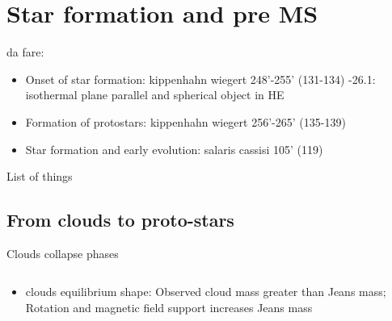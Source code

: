 \section{Star formation and pre MS}

\begin{wordonframe}{da fare: }
\begin{itemize}
\item Onset of star formation: kippenhahn wiegert 248'-255' (131-134) -26.1: isothermal plane parallel and spherical object in HE
\item Formation of protostars: kippenhahn wiegert 256'-265' (135-139)
\item Star formation and early evolution: salaris cassisi 105' (119)
\end{itemize}
\end{wordonframe}


\begin{frame}[allowframebreaks]{List of things}
\listofkeywords
\listoftodos
\end{frame}

\subsection{From clouds to proto-stars}

\begin{frame}{Clouds collapse phases}
\begin{columns}[T]\begin{column}{0.5\textwidth}
\begin{itemize}
\item clouds equilibrium shape: Observed cloud mass greater than Jeans mass; Rotation and magnetic field support increases Jeans mass
\end{itemize}
	\end{column}\begin{column}{0.5\textwidth}

\end{column}\end{columns}
\end{frame}

